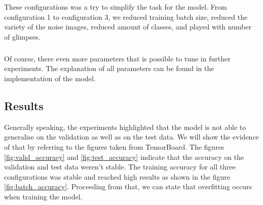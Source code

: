 \begin{table}[]
\centering
{}
\caption{Configurations for the experiments}
\label{tab:conf_exp}
\end{table}

These configurations was a try to simplify the task for the model. From configuration 1
to configuration 3, we reduced training batch size, reduced the variety of the noise images,
reduced amount of classes, and played with number of glimpses.

\subparagraph{}
Of course, there even more parameters that is possible to tune
in further experiments. The explanation of all parameters can be found
in the implementation of the model.

\subsection{Results}
Generally speaking, the experiments highlighted that the model is not able
to generalise on the validation as well as on the test data.
We will show the evidence of that by referring to the figures taken from
TensorBoard.
The figures \ref{fig:valid_accuracy} and \ref{fig:test_accuracy} indicate that the accuracy on the validation
and test data weren't stable. The training accuracy for all three configurations
was stable and reached high results as shown in the figure \ref{fig:batch_accuracy}.
Proceeding from that, we can state that overfitting occurs
when training the model.

